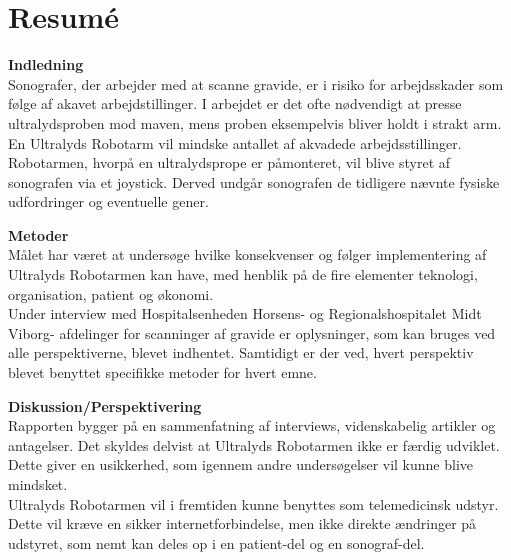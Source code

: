 \chapter{Resumé}
\textbf{Indledning} \\ 
Sonografer, der arbejder med at scanne gravide, er i risiko for arbejdsskader  som følge af akavet arbejdstillinger. I arbejdet er det ofte nødvendigt at presse ultralydsproben mod maven, mens proben eksempelvis bliver holdt i strakt arm. En Ultralyds Robotarm vil mindske antallet af akvadede arbejdsstillinger. Robotarmen, hvorpå en ultralydsprope er påmonteret, vil blive styret af sonografen via et joystick. Derved undgår sonografen de tidligere nævnte fysiske udfordringer og eventuelle gener. 

\textbf{Metoder} \\ 
Målet har været at undersøge hvilke konsekvenser  og følger implementering af Ultralyds Robotarmen kan  have, med henblik på de fire elementer teknologi, organisation, patient og økonomi. \\
Under interview med Hospitalsenheden Horsens- og Regionalshospitalet Midt Viborg- afdelinger for scanninger af gravide er  oplysninger, som kan bruges ved alle perspektiverne, blevet indhentet. Samtidigt er der ved, hvert perspektiv blevet benyttet  specifikke metoder for hvert emne. 

\textbf{Diskussion/Perspektivering} \\ 
Rapporten bygger på en sammenfatning af interviews, videnskabelig artikler og antagelser. Det skyldes delvist at Ultralyds Robotarmen ikke er færdig udviklet. Dette giver en usikkerhed, som igennem andre undersøgelser vil kunne blive mindsket. \\
Ultralyds Robotarmen vil  i fremtiden kunne benyttes som telemedicinsk udstyr. Dette vil kræve en sikker internetforbindelse, men ikke direkte ændringer på udstyret, som nemt kan deles op i en patient-del og en sonograf-del.  
